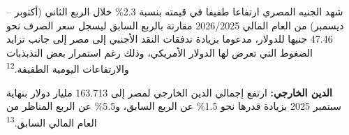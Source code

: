 شهد الجنيه المصري ارتفاعا طفيفا في قيمته بنسبة 2.3\% خلال الربع الثاني (أكتوبر -- ديسمبر) من العام المالي 2026/2025 مقارنة بالربع السابق ليسجل سعر الصرف نحو 47.46 جنيها للدولار، مدعوما بزيادة تدفقات النقد الأجنبي إلى مصر إلى جانب تزايد الضغوط التي تعرض لها الدولار الأمريكي، وذلك رغم استمرار بعض التذبذبات والارتفاعات اليومية الطفيفة.\textsuperscript{12}

\vspace{0.6em}
\noindent\textbf{الدين الخارجي:} ارتفع إجمالي الدين الخارجي لمصر إلى 163.713 مليار دولار بنهاية سبتمبر 2025 بزيادة قدرها نحو 1.5\% عن الربع السابق، و5.5\% عن الربع المناظر من العام المالي السابق.\textsuperscript{13}
